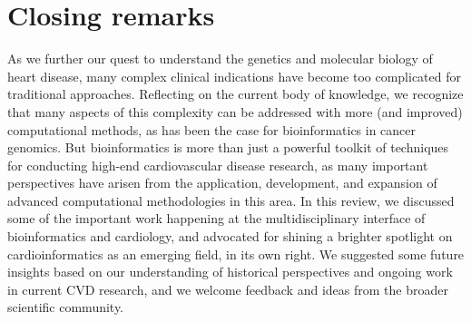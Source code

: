 \documentclass[letter]{bioinfo}
\begin{document}
	

	

	
	

	
	
	
	

	


	
	
	
	
	\section*{Closing remarks}
	As we further our quest to understand the genetics and molecular biology of heart disease, many complex clinical indications have become too complicated for traditional approaches. Reflecting on the current body of knowledge, we recognize that many aspects of this complexity can be addressed with more (and improved) computational methods, as has been the case for bioinformatics in cancer genomics.  But bioinformatics is more than just a powerful toolkit of techniques for conducting high-end cardiovascular disease research, as many important perspectives have arisen from the application, development, and expansion of advanced computational methodologies in this area.  In this review, we discussed some of the important work happening at the multidisciplinary interface of bioinformatics and cardiology, and advocated for shining a brighter spotlight on cardioinformatics as an emerging field, in its own right.  We suggested some future insights based on our understanding of historical perspectives and ongoing work in current CVD research, and we welcome feedback and ideas from the broader scientific community.
\end{document}
